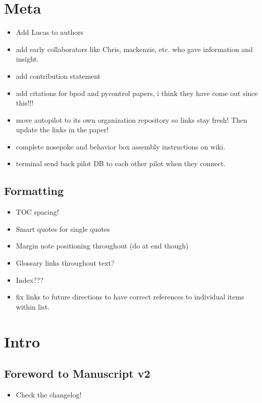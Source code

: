\section{Meta}

\begin{itemize}
\item Add Lucas to authors
\item add early collaborators like Chris, mackenzie, etc. who gave information and insight.
\item add contribution statement
\item add citations for bpod and pycontrol papers, i think they have come out since this!!!
\item move autopilot to its own organization repository so links stay fresh! Then update the links in the paper!
\item complete nosepoke and behavior box assembly instructions on wiki.
\item terminal send back pilot DB to each other pilot when they connect.
\end{itemize}

\subsection{Formatting}

\begin{itemize}
\item TOC spacing!
\item Smart quotes for single quotes
\item Margin note positioning throughout (do at end though)
\item Glossary links throughout text?
\item Index???
\item fix links to future directions to have correct references to individual items within list.
\end{itemize}

\section{Intro}

\subsection{Foreword to Manuscript v2}

\begin{itemize}
\item Check the changelog!
\end{itemize}

